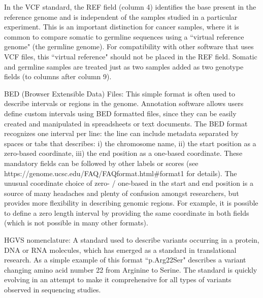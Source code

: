\begin{framed}
{In the VCF standard, the REF field (column 4) identifies the base present in the reference genome and is independent of the samples studied in a particular experiment. This is an important distinction for cancer samples, where it is common to compare somatic to germline sequences using a ``virtual reference genome" (the germline genome). For compatibility with other software that uses VCF files, this ``virtual reference" should not be placed in the REF field. Somatic and germline samples are treated just as two samples added as two genotype fields (to columns after column 9).

BED (Browser Extensible Data) Files: This simple format is often used to describe intervals or regions in the genome. Annotation software allows users define custom intervals using BED formatted files, since they can be easily created and manipulated in spreadsheets or text documents. The BED format recognizes one interval per line: the line can include metadata separated by spaces or tabs that describes: i) the chromosome name, ii) the start position as a zero-based coordinate, iii) the end position as a one-based coordinate. These mandatory fields can be followed by other labels or scores (see https://genome.ucsc.edu/FAQ/FAQformat.html\#format1 for details). The unusual coordinate choice of zero- / one-based in the start and end position is a source of many headaches and plenty of confusion amongst researchers, but provides more flexibility in describing genomic regions. For example, it is possible to define a zero length interval by providing the same coordinate in both fields (which is not possible in many other formats).

HGVS nomenclature: A standard used to describe variants occurring in a protein, DNA or RNA molecules, which has emerged as a standard in translational research. As a simple example of this format ``p.Arg22Ser" describes a variant changing amino acid number 22 from Arginine to Serine. The standard is quickly evolving in an attempt to make it comprehensive for all types of variants observed in sequencing studies. 

}
\end{framed}
